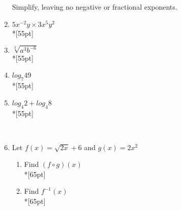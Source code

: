 \documentclass[]{book}
\begin{document}
\begin{enumerate}
\begin{figure}[!htbp]
\begin{center}
\begin{tikzpicture}[xscale= 0.2, yscale=0.015]
\end{tikzpicture}
\end{center}
\end{figure}

\newpage


Simplify, leaving no negative or fractional exponents.



\item $5x^{-2}y \times 3x^5 y^{2}$\\*[55pt]
\item $\sqrt[3]{a^3 b^{-6}}$\\*[55pt]
\item $log_7 49$\\*[55pt]
\item $log_4 2 + log_4 8$\\*[55pt]

\
\item Let $f(x) = \sqrt{2x} +6$ and $g(x)=2x^2$
\begin{enumerate}
    \item Find $(f \circ g)(x)$\\*[65pt]
    \item Find $f^{-1}(x)$\\*[65pt]
\end{enumerate}


\end{enumerate}
\end{document}
